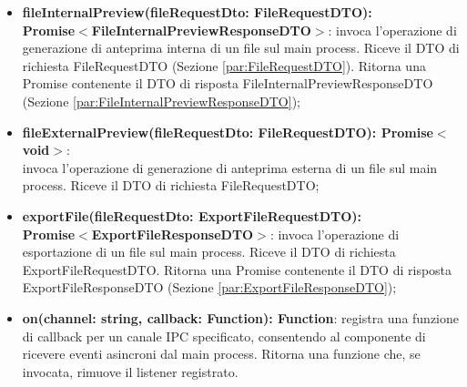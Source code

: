 \documentclass[a4paper,12pt]{article}
\begin{document}
{{{{\begin{itemize}
                    \item \textbf{fileInternalPreview(fileRequestDto: FileRequestDTO):\\ Promise$<$FileInternalPreviewResponseDTO$>$}: invoca l'operazione di generazione di anteprima interna di un file sul main process. Riceve il DTO di richiesta FileRequestDTO (Sezione \ref{par:FileRequestDTO}). Ritorna una Promise contenente il DTO di risposta FileInternalPreviewResponseDTO (Sezione \ref{par:FileInternalPreviewResponseDTO});
                    \item \textbf{fileExternalPreview(fileRequestDto: FileRequestDTO): Promise$<$void$>$}:\\ invoca l'operazione di generazione di anteprima esterna di un file sul main process. Riceve il DTO di richiesta FileRequestDTO;
                    \item \textbf{exportFile(fileRequestDto: ExportFileRequestDTO):\\ Promise$<$ExportFileResponseDTO$>$}: invoca l'operazione di esportazione di un file sul main process. Riceve il DTO di richiesta ExportFileRequestDTO. Ritorna una Promise contenente il DTO di risposta ExportFileResponseDTO (Sezione \ref{par:ExportFileResponseDTO});
                    \item \textbf{on(channel: string, callback: Function): Function}: registra una funzione di callback per un canale IPC specificato, consentendo al componente di ricevere eventi asincroni dal main process. Ritorna una funzione che, se invocata, rimuove il listener registrato.
                \end{itemize}
}}}}
\end{document}
